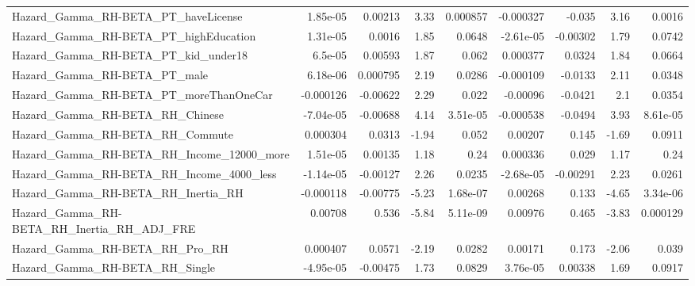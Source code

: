 \begin{tabular}{lrrrrrrrr}
Hazard\_Gamma\_RH-BETA\_PT\_haveLicense                &    1.85e-05 &      0.00213 &     3.33 & 0.000857 &  -0.000327 &      -0.035 &         3.16 &        0.0016 \\
Hazard\_Gamma\_RH-BETA\_PT\_highEducation              &    1.31e-05 &       0.0016 &     1.85 &   0.0648 &  -2.61e-05 &    -0.00302 &         1.79 &        0.0742 \\
Hazard\_Gamma\_RH-BETA\_PT\_kid\_under18                &     6.5e-05 &      0.00593 &     1.87 &    0.062 &   0.000377 &      0.0324 &         1.84 &        0.0664 \\
Hazard\_Gamma\_RH-BETA\_PT\_male                       &    6.18e-06 &     0.000795 &     2.19 &   0.0286 &  -0.000109 &     -0.0133 &         2.11 &        0.0348 \\
Hazard\_Gamma\_RH-BETA\_PT\_moreThanOneCar             &   -0.000126 &     -0.00622 &     2.29 &    0.022 &   -0.00096 &     -0.0421 &          2.1 &        0.0354 \\
Hazard\_Gamma\_RH-BETA\_RH\_Chinese                    &   -7.04e-05 &     -0.00688 &     4.14 & 3.51e-05 &  -0.000538 &     -0.0494 &         3.93 &      8.61e-05 \\
Hazard\_Gamma\_RH-BETA\_RH\_Commute                    &    0.000304 &       0.0313 &    -1.94 &    0.052 &    0.00207 &       0.145 &        -1.69 &        0.0911 \\
Hazard\_Gamma\_RH-BETA\_RH\_Income\_12000\_more          &    1.51e-05 &      0.00135 &     1.18 &     0.24 &   0.000336 &       0.029 &         1.17 &          0.24 \\
Hazard\_Gamma\_RH-BETA\_RH\_Income\_4000\_less           &   -1.14e-05 &     -0.00127 &     2.26 &   0.0235 &  -2.68e-05 &    -0.00291 &         2.23 &        0.0261 \\
Hazard\_Gamma\_RH-BETA\_RH\_Inertia\_RH                 &   -0.000118 &     -0.00775 &    -5.23 & 1.68e-07 &    0.00268 &       0.133 &        -4.65 &      3.34e-06 \\
Hazard\_Gamma\_RH-BETA\_RH\_Inertia\_RH\_ADJ\_FRE         &     0.00708 &        0.536 &    -5.84 & 5.11e-09 &    0.00976 &       0.465 &        -3.83 &      0.000129 \\
Hazard\_Gamma\_RH-BETA\_RH\_Pro\_RH                     &    0.000407 &       0.0571 &    -2.19 &   0.0282 &    0.00171 &       0.173 &        -2.06 &         0.039 \\
Hazard\_Gamma\_RH-BETA\_RH\_Single                     &   -4.95e-05 &     -0.00475 &     1.73 &   0.0829 &   3.76e-05 &     0.00338 &         1.69 &        0.0917 \\

\end{tabular}
